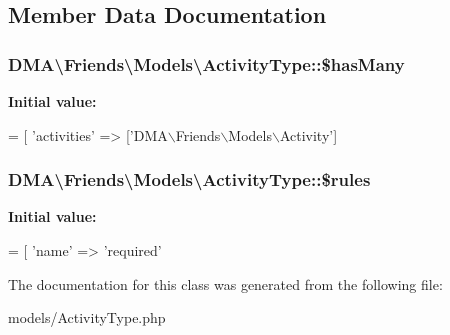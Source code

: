\subsection{Member Data Documentation}
\hypertarget{classDMA_1_1Friends_1_1Models_1_1ActivityType_ab2f9dcb8f38fe05674e0ca65ef86c061}{
\subsubsection[{\$has\-Many}]{\setlength{\rightskip}{0pt plus 5cm}D\-M\-A\textbackslash{}\-Friends\textbackslash{}\-Models\textbackslash{}\-Activity\-Type\-::\$has\-Many}}\label{classDMA_1_1Friends_1_1Models_1_1ActivityType_ab2f9dcb8f38fe05674e0ca65ef86c061}
{\bfseries Initial value\-:}
\begin{DoxyCode}
= [
        \textcolor{stringliteral}{'activities'}    => [\textcolor{stringliteral}{'DMA\(\backslash\)Friends\(\backslash\)Models\(\backslash\)Activity'}]
\end{DoxyCode}
\hypertarget{classDMA_1_1Friends_1_1Models_1_1ActivityType_a15a6ae9c0d6533dfd440a14afce6691c}{
\subsubsection[{\$rules}]{\setlength{\rightskip}{0pt plus 5cm}D\-M\-A\textbackslash{}\-Friends\textbackslash{}\-Models\textbackslash{}\-Activity\-Type\-::\$rules}}\label{classDMA_1_1Friends_1_1Models_1_1ActivityType_a15a6ae9c0d6533dfd440a14afce6691c}
{\bfseries Initial value\-:}
\begin{DoxyCode}
= [ 
        \textcolor{stringliteral}{'name'} => \textcolor{stringliteral}{'required'}
\end{DoxyCode}


The documentation for this class was generated from the following file\-:\begin{DoxyCompactItemize}
\item 
models/Activity\-Type.\-php\end{DoxyCompactItemize}
